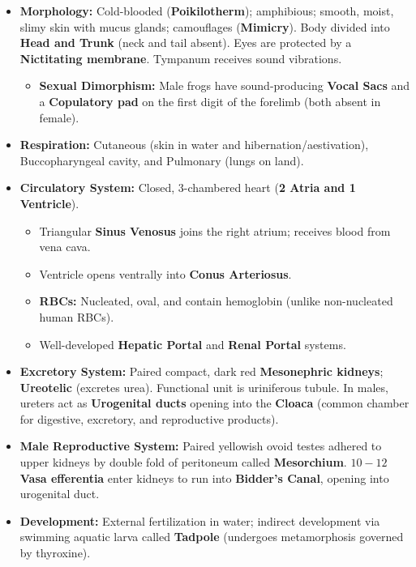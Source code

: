 \documentclass[10pt,a4paper]{article}
\begin{document}
\begin{conceptbox}
\begin{itemize}
  \item \textbf{Morphology:} Cold-blooded (\textbf{Poikilotherm}); amphibious; smooth, moist, slimy skin with mucus glands; camouflages (\textbf{Mimicry}). Body divided into \textbf{Head and Trunk} (neck and tail absent). Eyes are protected by a \textbf{Nictitating membrane}. Tympanum receives sound vibrations.
  \begin{itemize}
    \item \textbf{Sexual Dimorphism:} Male frogs have sound-producing \textbf{Vocal Sacs} and a \textbf{Copulatory pad} on the first digit of the forelimb (both absent in female).
  \end{itemize}
  \item \textbf{Respiration:} Cutaneous (skin in water and hibernation/aestivation), Buccopharyngeal cavity, and Pulmonary (lungs on land).
  \item \textbf{Circulatory System:} Closed, 3-chambered heart (\textbf{2 Atria and 1 Ventricle}).
  \begin{itemize}
    \item Triangular \textbf{Sinus Venosus} joins the right atrium; receives blood from vena cava.
    \item Ventricle opens ventrally into \textbf{Conus Arteriosus}.
    \item \textbf{RBCs:} Nucleated, oval, and contain hemoglobin (unlike non-nucleated human RBCs).
    \item Well-developed \textbf{Hepatic Portal} and \textbf{Renal Portal} systems.
  \end{itemize}
  \item \textbf{Excretory System:} Paired compact, dark red \textbf{Mesonephric kidneys}; \textbf{Ureotelic} (excretes urea). Functional unit is uriniferous tubule. In males, ureters act as \textbf{Urogenital ducts} opening into the \textbf{Cloaca} (common chamber for digestive, excretory, and reproductive products).
  \item \textbf{Male Reproductive System:} Paired yellowish ovoid testes adhered to upper kidneys by double fold of peritoneum called \textbf{Mesorchium}. $10-12$ \textbf{Vasa efferentia} enter kidneys to run into \textbf{Bidder's Canal}, opening into urogenital duct.
  \item \textbf{Development:} External fertilization in water; indirect development via swimming aquatic larva called \textbf{Tadpole} (undergoes metamorphosis governed by thyroxine).
\end{itemize}
\end{conceptbox}
\end{document}
